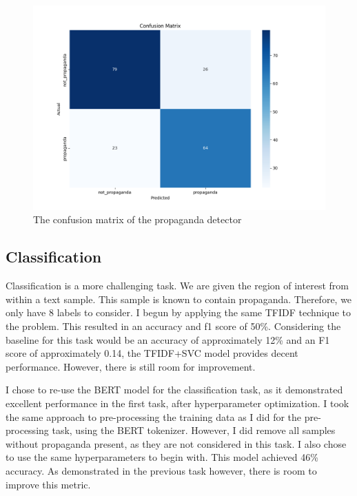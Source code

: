 \documentclass[twocolumn]{article}
\begin{document}
\begin{figure}
    \centering 
    \includegraphics*[scale=0.25]{../assets/propaganda-detection-confusion-matrix.png}
    \caption{The confusion matrix of the propaganda detector}
    \label{fig:detection-cm}
\end{figure}

\subsection{Classification}

Classification is a more challenging task. We are given the region of interest from within a text sample. This sample is known to contain propaganda. Therefore, we only have 8 labels to consider. I begun by applying the same TFIDF technique to the problem. This resulted in an accuracy and f1 score of 50\%. Considering the baseline for this task would be an accuracy of approximately 12\% and an F1 score of approximately 0.14, the TFIDF+SVC model provides decent performance. However, there is still room for improvement. 

I chose to re-use the BERT model for the classification task, as it demonstrated excellent performance in the first task, after hyperparameter optimization. I took the same approach to pre-processing the training data as I did for the pre-processing task, using the BERT tokenizer. However, I did remove all samples without propaganda present, as they are not considered in this task. I also chose to use the same hyperparameters to begin with. This model achieved 46\% accuracy. As demonstrated in the previous task however, there is room to improve this metric. 
\end{document}
